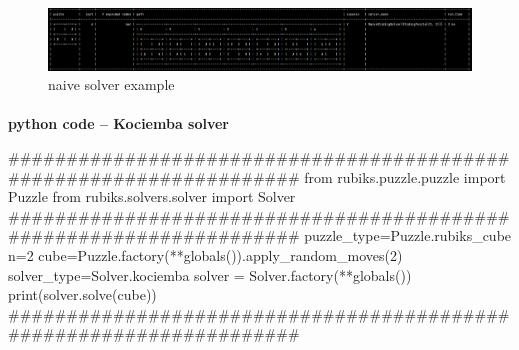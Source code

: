 \begin{figure}[H]
\centering
\includegraphics[scale=0.39]{./Figures/examplenaivesolver}
\caption[Examples]{naive solver example}
\label{fig:examplenaivesolver}
\end{figure}





\afblue
\paragraph{}{\textbf{python code -- Kociemba solver}}
\begin{python}
####################################################################
from rubiks.puzzle.puzzle import Puzzle
from rubiks.solvers.solver import Solver
####################################################################
puzzle_type=Puzzle.rubiks_cube
n=2
cube=Puzzle.factory(**globals()).apply_random_moves(2)
solver_type=Solver.kociemba
solver = Solver.factory(**globals())
print(solver.solve(cube))
####################################################################

\end{python}
\black

